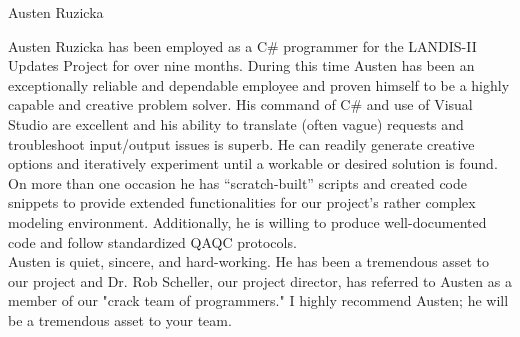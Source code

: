 \documentclass[12pt,recommendation,sign]{university_recommendation}
\begin{document}
\begin{letter}{Austen Ruzicka}
\opening{}
Austen Ruzicka has been employed as a C\# programmer for the LANDIS-II Updates Project for over nine months. During this time Austen has been an exceptionally reliable and dependable employee and proven himself to be a highly capable and creative problem solver. His command of C\# and use of Visual Studio are excellent and his ability to translate (often vague) requests and troubleshoot input/output issues is superb. He can readily generate creative options and iteratively experiment until a workable or desired solution is found. On more than one occasion he has \enquote{scratch-built} scripts and created code snippets to provide extended functionalities for our project's rather complex modeling environment. Additionally, he is willing to produce well-documented code and follow standardized QAQC protocols. \\

Austen is quiet, sincere, and hard-working. He has been a tremendous asset to our project and Dr. Rob Scheller, our project director, has referred to Austen as a member of our "crack team of programmers." I highly recommend Austen; he will be a tremendous asset to your team.




\closing{}
\end{letter}

		
\end{document}
